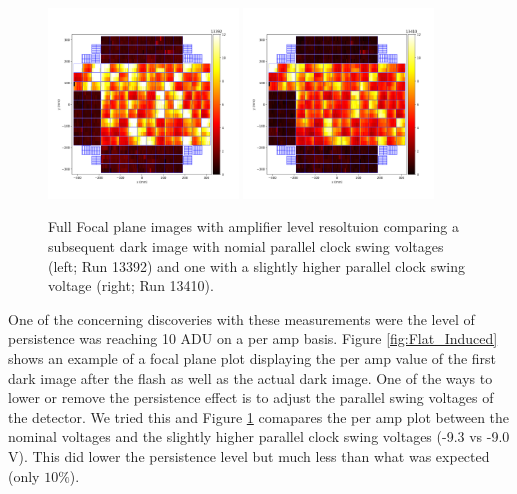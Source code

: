 \documentclass[DM,authoryear,toc]{lsstdoc}
\begin{document}
\begin{figure}[!htp]
  \centering
  \includegraphics[width=0.45\textwidth, angle=0]{Run_13392_Persistence.png}
  \includegraphics[width=0.45\textwidth, angle=0]{Run_13410_Persistence_Lower.png}
  \caption{
  Full Focal plane images with amplifier level resoltuion comparing a subsequent dark image with nomial parallel clock swing voltages (left; Run 13392) 
  and one with a slightly higher parallel clock swing voltage (right; Run 13410).
  }\label{fig:Flat_Induced_Comparison}
\end{figure}

One of the concerning discoveries with these measurements were the level of persistence was reaching 10 ADU on a per amp basis.
Figure \ref{fig:Flat_Induced} shows an example of a focal plane plot displaying the per amp value of the first dark image after the flash as well as the actual dark image.
One of the ways to lower or remove the persistence effect is to adjust the parallel swing voltages of the detector.
We tried this and Figure \ref{fig:Flat_Induced_Comparison} comapares the per amp plot between the nominal voltages and the slightly higher parallel clock swing voltages (-9.3 vs -9.0 V).
This did lower the persistence level but much less than what was expected (only $10\%$).
\end{document}
